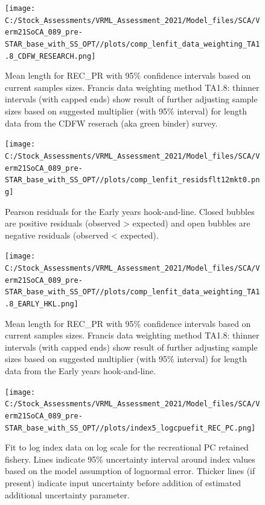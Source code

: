 \documentclass[11pt,
  english,
  a4paper,
]{article}
\begin{document}
\begin{figure}
\centering
\texttt{[image: C:/Stock\_Assessments/VRML\_Assessment\_2021/Model\_files/SCA/Verm21SoCA\_089\_pre-STAR\_base\_with\_SS\_OPT//plots/comp\_lenfit\_data\_weighting\_TA1.8\_CDFW\_RESEARCH.png]}
\caption{Mean length for REC\_PR with 95\% confidence intervals based on current samples sizes. Francis data weighting method TA1.8: thinner intervals (with capped ends) show result of further adjusting sample sizes based on suggested multiplier (with 95\% interval) for length data from the CDFW reserach (aka green binder) survey.\label{fig:mean-len-fit-CDFW-RESEARCH}}
\end{figure}

\begin{figure}
\centering
\texttt{[image: C:/Stock\_Assessments/VRML\_Assessment\_2021/Model\_files/SCA/Verm21SoCA\_089\_pre-STAR\_base\_with\_SS\_OPT//plots/comp\_lenfit\_residsflt12mkt0.png]}
\caption{Pearson residuals for the Early years hook-and-line. Closed bubbles are positive residuals (observed \textgreater{} expected) and open bubbles are negative residuals (observed \textless{} expected).\label{fig:len-pearson-EARLY-HKL}}
\end{figure}

\begin{figure}
\centering
\texttt{[image: C:/Stock\_Assessments/VRML\_Assessment\_2021/Model\_files/SCA/Verm21SoCA\_089\_pre-STAR\_base\_with\_SS\_OPT//plots/comp\_lenfit\_data\_weighting\_TA1.8\_EARLY\_HKL.png]}
\caption{Mean length for REC\_PR with 95\% confidence intervals based on current samples sizes. Francis data weighting method TA1.8: thinner intervals (with capped ends) show result of further adjusting sample sizes based on suggested multiplier (with 95\% interval) for length data from the Early years hook-and-line.\label{fig:mean-len-fit-EARLY-HKL}}
\end{figure}

\FloatBarrier

\FloatBarrier

\begin{figure}
\centering
\texttt{[image: C:/Stock\_Assessments/VRML\_Assessment\_2021/Model\_files/SCA/Verm21SoCA\_089\_pre-STAR\_base\_with\_SS\_OPT//plots/index5\_logcpuefit\_REC\_PC.png]}
\caption{Fit to log index data on log scale for the recreational PC retained fishery. Lines indicate 95\% uncertainty interval around index values based on the model assumption of lognormal error. Thicker lines (if present) indicate input uncertainty before addition of estimated additional uncertainty parameter.\label{fig:log-cpue-REC-PC}}
\end{figure}
\end{document}
